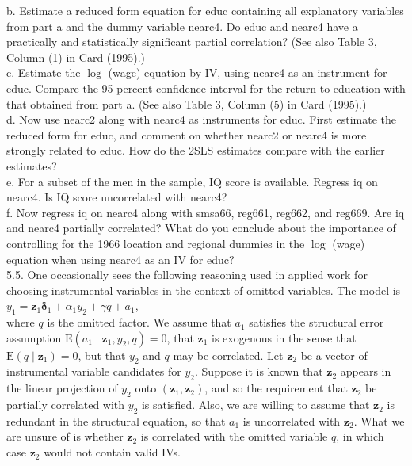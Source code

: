 \documentclass[10pt]{article}
\begin{document}
b. Estimate a reduced form equation for educ containing all explanatory variables from part a and the dummy variable nearc4. Do educ and nearc4 have a practically and statistically significant partial correlation? (See also Table 3, Column (1) in Card (1995).)\\
c. Estimate the $\log$ (wage) equation by IV, using nearc4 as an instrument for educ. Compare the 95 percent confidence interval for the return to education with that obtained from part a. (See also Table 3, Column (5) in Card (1995).)\\
d. Now use nearc2 along with nearc4 as instruments for educ. First estimate the reduced form for educ, and comment on whether nearc2 or nearc4 is more strongly related to educ. How do the 2SLS estimates compare with the earlier estimates?\\
e. For a subset of the men in the sample, IQ score is available. Regress iq on nearc4. Is IQ score uncorrelated with nearc4?\\
f. Now regress iq on nearc4 along with smsa66, reg661, reg662, and reg669. Are iq and nearc4 partially correlated? What do you conclude about the importance of controlling for the 1966 location and regional dummies in the $\log$ (wage) equation when using nearc4 as an IV for educ?\\
5.5. One occasionally sees the following reasoning used in applied work for choosing instrumental variables in the context of omitted variables. The model is\\
$y_{1}=\mathbf{z}_{1} \boldsymbol{\delta}_{1}+\alpha_{1} y_{2}+\gamma q+a_{1}$,\\
where $q$ is the omitted factor. We assume that $a_{1}$ satisfies the structural error assumption $\mathrm{E}\left(a_{1} \mid \mathbf{z}_{1}, y_{2}, q\right)=0$, that $\mathbf{z}_{1}$ is exogenous in the sense that $\mathrm{E}\left(q \mid \mathbf{z}_{1}\right)=0$, but that $y_{2}$ and $q$ may be correlated. Let $\mathbf{z}_{2}$ be a vector of instrumental variable candidates for $y_{2}$. Suppose it is known that $\mathbf{z}_{2}$ appears in the linear projection of $y_{2}$ onto $\left(\mathbf{z}_{1}, \mathbf{z}_{2}\right)$, and so the requirement that $\mathbf{z}_{2}$ be partially correlated with $y_{2}$ is satisfied. Also, we are willing to assume that $\mathbf{z}_{2}$ is redundant in the structural equation, so that $a_{1}$ is uncorrelated with $\mathbf{z}_{2}$. What we are unsure of is whether $\mathbf{z}_{2}$ is correlated with the omitted variable $q$, in which case $\mathbf{z}_{2}$ would not contain valid IVs.
\end{document}

